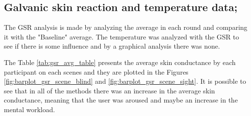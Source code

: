 \subsection{Galvanic skin reaction and temperature data;}
\label{subsec:results_gsr_temp}

The GSR analysis is made by analyzing the average in each round and comparing it with the "Baseline" average. The temperature was analyzed with the GSR to see if there is some influence and by a graphical analysis there was none.

The Table \ref{tab:gsr_avg_table} presents the average skin conductance by each participant on each scenes and they are plotted in the Figures \ref{fig:barplot_gsr_scene_blind} and \ref{fig:barplot_gsr_scene_sight}. It is possible to see that in all of the methods there was an increase in the average skin conductance, meaning that the user was aroused and maybe an increase in the mental workload.



